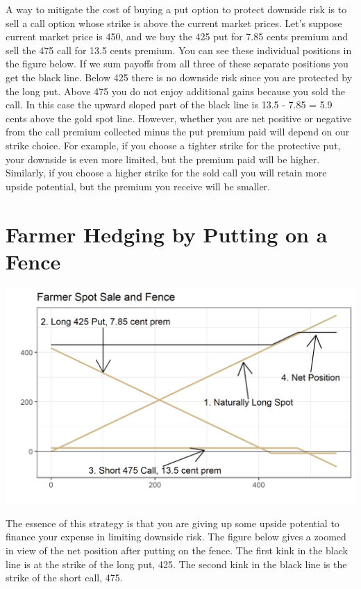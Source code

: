 \documentclass[
]{book}
\begin{document}
A way to mitigate the cost of buying a put option to protect downside risk is to sell a call option whose strike is above the current market prices. Let's suppose current market price is 450, and we buy the 425 put for 7.85 cents premium and sell the 475 call for 13.5 cents premium. You can see these individual positions in the figure below. If we sum payoffs from all three of these separate positions you get the black line. Below 425 there is no downside risk since you are protected by the long put. Above 475 you do not enjoy additional gains because you sold the call. In this case the upward sloped part of the black line is 13.5 - 7.85 = 5.9 cents above the gold spot line. However, whether you are net positive or negative from the call premium collected minus the put premium paid will depend on our strike choice. For example, if you choose a tighter strike for the protective put, your downside is even more limited, but the premium paid will be higher. Similarly, if you choose a higher strike for the sold call you will retain more upside potential, but the premium you receive will be smaller.

\hypertarget{farmer-hedging-by-putting-on-a-fence}{%
\section{Farmer Hedging by Putting on a Fence}\label{farmer-hedging-by-putting-on-a-fence}}

\includegraphics{assets/Options4-spotfence.png}

The essence of this strategy is that you are giving up some upside potential to finance your expense in limiting downside risk. The figure below gives a zoomed in view of the net position after putting on the fence. The first kink in the black line is at the strike of the long put, 425. The second kink in the black line is the strike of the short call, 475.
\end{document}
